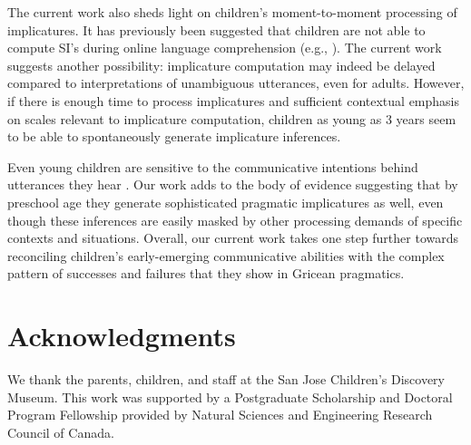 \documentclass[10pt,letterpaper]{article}
\begin{document}
The current work also sheds light on children's moment-to-moment processing of implicatures. It has previously been suggested that children are not able to compute SI's during online language comprehension (e.g., ). The current work suggests another possibility: implicature computation may indeed be delayed compared to interpretations of unambiguous utterances, even for adults. However, if there is enough time to process implicatures and sufficient contextual emphasis on scales relevant to implicature computation, children as young as 3 years seem to be able to spontaneously generate implicature inferences. 

Even young children are sensitive to the communicative intentions behind utterances they hear \cite{clark2009first,baldwin1993early}. Our work adds to the body of evidence suggesting that by preschool age they generate sophisticated pragmatic implicatures as well, even though these inferences are easily masked by other processing demands of specific contexts and situations. Overall, our current work takes one step further towards reconciling children's early-emerging communicative abilities with the complex pattern of successes and failures that they show in Gricean pragmatics.

\section{Acknowledgments}

We thank the parents, children, and staff at the San Jose Children's Discovery Museum. This work was supported by a Postgraduate Scholarship and Doctoral Program Fellowship provided by Natural Sciences and Engineering Research Council of Canada.



\setlength{\bibleftmargin}{.125in}
\setlength{\bibindent}{-\bibleftmargin}


\end{document}
